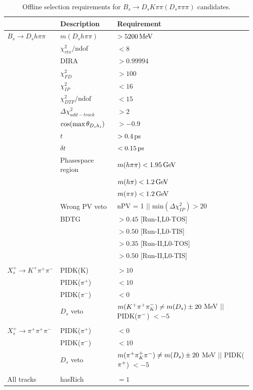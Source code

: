 \begin{table}[h]
\centering
\caption{Offline selection requirements for $B_s\to D_s K \pi\pi (D_s \pi\pi\pi)$ candidates.}
 \renewcommand{\arraystretch}{1.}
 \small
 \begin{tabular}{l l l}
\hline
\hline
 & Description & Requirement  \\
\hline
$B_s \to D_s h \pi \pi$  & $m(D_s h \pi \pi)$ & $> 5200 \mathrm{\,Me\kern -0.1em V}$ \\
&  $\chi^{2}_{vtx}/\text{ndof}  $&$ <  8$ \\
& DIRA &$ > 0.99994$ \\
& $\chi^{2}_{FD}$ & $> 100$ \\
& $\chi^{2}_{IP}$ & $< 16$ \\
&  $\chi^{2}_{DTF}/\text{ndof} $&$   <  15 $ \\
&  $\Delta\chi^{2}_{add-track} $&$   >  2 $ \\
& $\cos(\text{max} \, \theta_{{{D}_{s}} h_{i}})$ &$   > -0.9 $ \\
& $t$  & $ > 0.4 {\mathrm{ \,ps}}$ \\
& $\delta t$  & $ < 0.15 {\mathrm{ \,ps}}$ \\
& Phasespace region & $m(h\pi\pi) < 1.95 \mathrm{\,Ge\kern -0.1em V}$ \\ & & $m(h\pi) < 1.2 \mathrm{\,Ge\kern -0.1em V}$ \\ & & $m(\pi\pi) < 1.2 \mathrm{\,Ge\kern -0.1em V}$ \\
& Wrong PV veto & nPV = 1 $||$  $\text{min}(\Delta\chi^{2}_{IP}) > 20$ \\
& BDTG &  $> 0.45$ [Run-I,\textsf{L0-TOS}] \\
& & $> 0.50$ [Run-I,\textsf{L0-TIS}] \\
& & $> 0.35$ [Run-II,\textsf{L0-TOS}] \\
& & $> 0.50$ [Run-II,\textsf{L0-TIS}] \\
\\
$X_s^+ \to K^+ \pi^+ \pi^-$  & PIDK(K) & $> 10$ \\
& PIDK($\pi^+$) & $< 10$ \\
& PIDK($\pi^-$) & $< 0$ \\
& $D_s$ veto & $m({{K}^+} {{\pi}^+} \pi^-_K) \ne m(D_s) \pm 20$ MeV $||$ PIDK(${{\pi}^-}$) $< -5$ \\
\\
$X_s^+ \to \pi^+ \pi^+ \pi^-$  & PIDK($\pi^+$) & $< 0$ \\
& PIDK($\pi^-$) & $< 10$ \\
& $D_s$ veto & $m({{\pi}^+} \pi^+_K {{\pi}^-}) \ne m(D_s) \pm 20$ MeV $||$ PIDK(${{\pi}^+}$) $< -5$ \\
\\
All tracks & hasRich & $= 1$ \\

\hline
\hline
\end{tabular}
\label{table:selBs}
\end{table}






